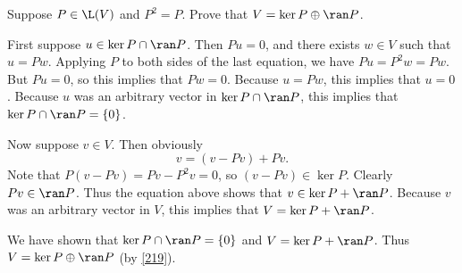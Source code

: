 \exercise
Suppose $P \in \L(V)$ and $P^2 = P$.  Prove that $V = \ker P \oplus \ran P$.

\begin{Solution}
First suppose $u \in \ker P \cap \ran P$.  Then $Pu = 0$, and there exists
$w \in V$ such that $u = Pw$.  Applying $P$ to both sides of the last equation, we
have $Pu = P^2 w = Pw$.  But $Pu = 0$, so this implies that
$Pw = 0$.  Because $u = Pw$, this implies that $u = 0$.  Because $u$ was an
arbitrary vector in $\ker P \cap \ran P$, this implies that $\ker P \cap \ran P
= \{0\}$.

Now suppose $v \in V$.  Then obviously
\[
v = (v - Pv) + Pv.
\]
Note that $P(v - Pv) = Pv - P^2v = 0$, so $(v - Pv) \in \ker P$.  Clearly
$Pv \in \ran P$.  Thus the equation above shows that $v \in \ker P + \ran P$.
Because $v$ was an arbitrary vector in $V$, this implies that
$V = \ker P + \ran P$.

We have shown that $\ker P \cap \ran P = \{0\}$ and $V = \ker P + \ran P$.  Thus
$V = \ker P \oplus \ran P$ (by \ref{219}).
\end{Solution}


